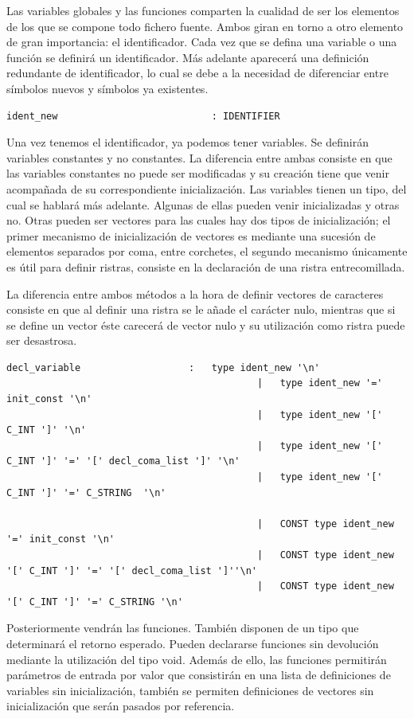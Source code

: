 \documentclass[a4paper,10pt]{article}
\begin{document}
Las variables globales y las funciones comparten la cualidad de ser los elementos de los que se compone todo fichero fuente. Ambos giran en torno a otro elemento de gran importancia: el identificador. Cada vez que se defina una variable o una función se definirá un identificador. Más adelante aparecerá una definición redundante de identificador, lo cual se debe a la necesidad de diferenciar entre símbolos nuevos y símbolos ya existentes.

\begin{lstlisting}
ident_new							: IDENTIFIER 
\end{lstlisting}

Una vez tenemos el identificador, ya podemos tener variables. Se definirán variables constantes y no constantes. La diferencia entre ambas consiste en que las variables constantes no puede ser modificadas y su creación tiene que venir acompañada de su correspondiente inicialización. Las variables tienen un tipo, del cual se hablará más adelante. Algunas de ellas pueden venir inicializadas y otras no. Otras pueden ser vectores para las cuales hay dos tipos de inicialización; el primer mecanismo de inicialización de vectores es mediante una sucesión de elementos separados por coma, entre corchetes, el segundo mecanismo únicamente es útil para definir ristras, consiste en la declaración de una ristra entrecomillada.

La diferencia entre ambos métodos a la hora de definir vectores de caracteres consiste en que al definir una ristra se le añade el carácter nulo, mientras que si se define un vector éste carecerá de vector nulo y su utilización como ristra puede ser desastrosa.

\begin{lstlisting}
decl_variable					:	type ident_new '\n' 
											|	type ident_new '=' init_const '\n' 
											|	type ident_new '[' C_INT ']' '\n' 
											|	type ident_new '[' C_INT ']' '=' '[' decl_coma_list ']' '\n' 
											|	type ident_new '[' C_INT ']' '=' C_STRING  '\n' 
												
											|	CONST type ident_new '=' init_const '\n' 
											|	CONST type ident_new '[' C_INT ']' '=' '[' decl_coma_list ']''\n' 
											|	CONST type ident_new '[' C_INT ']' '=' C_STRING '\n' 
\end{lstlisting}

Posteriormente vendrán las funciones. También disponen de un tipo que determinará el retorno esperado. Pueden declararse funciones sin devolución mediante la utilización del tipo void. Además de ello, las funciones permitirán parámetros de entrada por valor que consistirán en una lista de definiciones de variables sin inicialización, también se permiten definiciones de vectores sin inicialización que serán pasados por referencia.
\end{document}
